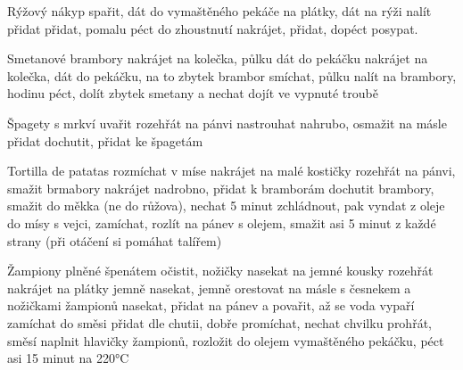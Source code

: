 \documentclass[12pt,a4paper]{article}
\begin{document}
\begin{recipe}{Rýžový nákyp}
   spařit, dát do vymaštěného pekáče
   na plátky, dát na rýži
   nalít
   přidat
   přidat, pomalu péct do zhoustnutí
   nakrájet, přidat, dopéct
   posypat.
\end{recipe}
\newpage

\begin{recipe}{Smetanové brambory}
   nakrájet na kolečka, půlku dát do pekáčku
   nakrájet na kolečka, dát do pekáčku, na to zbytek brambor
   smíchat, půlku nalít na brambory, hodinu péct, dolít zbytek smetany a nechat dojít ve vypnuté troubě
\end{recipe}
\newpage

\begin{recipe}{Špagety s mrkví}
   uvařit
   rozehřát na pánvi
   nastrouhat nahrubo, osmažit na másle
   přidat
   dochutit, přidat ke špagetám
\end{recipe}
\newpage

\begin{recipe}{Tortilla de patatas}
   rozmíchat v míse
   nakrájet na malé kostičky
   rozehřát na pánvi, smažit brmabory
   nakrájet nadrobno, přidat k bramborám
   dochutit brambory, smažit do měkka (ne do růžova), nechat 5 minut zchládnout, pak vyndat z oleje do mísy s vejci, zamíchat, rozlít na pánev s olejem, smažit asi 5 minut z každé strany (při otáčení si pomáhat talířem)
  
\end{recipe}
\newpage

\begin{recipe}{Žampiony plněné špenátem}
   očistit, nožičky nasekat na jemné kousky
   rozehřát
   nakrájet na plátky
   jemně nasekat, jemně orestovat na másle s česnekem a nožičkami žampionů
   nasekat, přidat na pánev a povařit, až se voda vypaří
   zamíchat do směsi
   přidat dle chutii, dobře promíchat, nechat chvilku prohřát, směsí naplnit hlavičky žampionů, rozložit do olejem vymaštěného pekáčku, péct asi 15 minut na 220°C
\end{recipe}
\newpage
\end{document}
